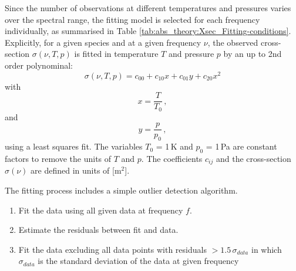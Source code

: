 Since the number of observations at different
temperatures and pressures varies over the spectral range, the fitting
model is selected for each frequency individually, as summarised in
Table \ref{tab:abs_theory:Xsec_Fitting-conditions}.
Explicitly, for a given species and at a given
frequency $\nu$, the observed cross-section
$\sigma(\nu,T,p)$ is fitted in temperature $T$ and pressure $p$
by an up to 2nd order polynominal:
\begin{equation}
  \label{eq:abs_theory:XsecFitmodel}
  \sigma(\nu,T,p)=c_{00}+c_{10}x+c_{01}y+c_{20}x^{2}
\end{equation}
 with 
 \begin{equation}
   \label{eq:abs_theory:Xsec_X_definition}
   x=\frac{T}{T_{0}}\,,
\end{equation}
and
\begin{equation}
  \label{eq:abs_theory:Xsec_Y_definition}
  y=\frac{p}{p_{0}}\,,
\end{equation}
using a least squares fit. The variables $T_{0}$ = 1\,K and $p_{0}$ = 1\,Pa
are constant factors to remove the units of $T$ and $p$. The coefficients
$c_{ij}$  and the cross-section $\sigma\left(\nu \right)$ are defined in units of [m$^2$]. 

The fitting process includes a simple outlier detection algorithm.
\begin{enumerate}
\item Fit the data using all given data at frequency $f$. 
\item Estimate the residuals between fit and data. 
\item Fit the data excluding all data points with residuals $>1.5\,\sigma_{data}$ in which
$\sigma_{data}$ is the standard deviation of the data at given frequency
\end{enumerate} 



